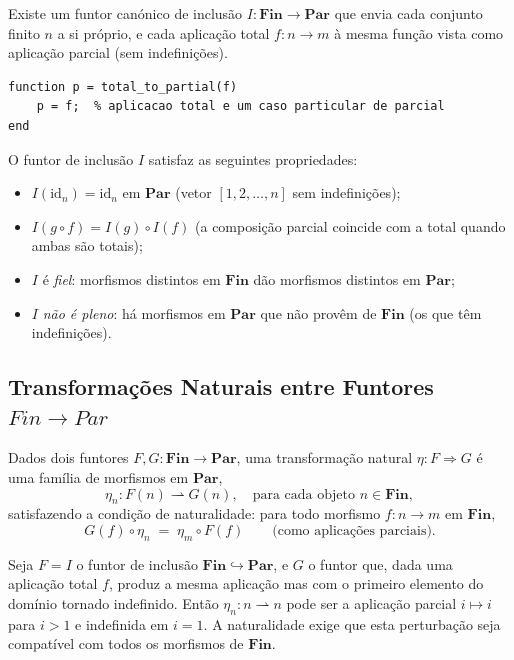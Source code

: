 Existe um funtor canónico de inclusão $I: \mathbf{Fin} \to \mathbf{Par}$ que envia cada conjunto finito $n$ a si próprio, e cada aplicação total $f: n \to m$ à mesma função vista como aplicação parcial (sem indefinições).

\begin{lstlisting}[style=matlab, caption={Funtor de inclusão $I: \mathbf{Fin} \to \mathbf{Par}$}]
function p = total_to_partial(f)
    p = f;  % aplicacao total e um caso particular de parcial
end
\end{lstlisting}

\begin{proposition}
O funtor de inclusão $I$ satisfaz as seguintes propriedades:
\begin{itemize}
    \item $I(\mathrm{id}_n) = \mathrm{id}_n$ em $\mathbf{Par}$ (vetor $[1, 2, \ldots, n]$ sem indefinições);
    \item $I(g \circ f) = I(g) \circ I(f)$ (a composição parcial coincide com a total quando ambas são totais);
    \item $I$ é \emph{fiel}: morfismos distintos em $\mathbf{Fin}$ dão morfismos distintos em $\mathbf{Par}$;
    \item $I$ \emph{não é pleno}: há morfismos em $\mathbf{Par}$ que não provêm de $\mathbf{Fin}$ (os que têm indefinições).
\end{itemize}
\end{proposition}

\subsection{Transformações Naturais entre Funtores \texorpdfstring{$Fin \to Par$}{Fin -> Par}}

Dados dois funtores $F, G: \mathbf{Fin} \to \mathbf{Par}$, uma transformação natural $\eta: F \Rightarrow G$ é uma família de morfismos em $\mathbf{Par}$,
\[
    \eta_n: F(n) \rightharpoonup G(n), \quad \text{para cada objeto } n \in \mathbf{Fin},
\]
satisfazendo a condição de naturalidade: para todo morfismo $f: n \to m$ em $\mathbf{Fin}$,
\[
    G(f) \circ \eta_n \;=\; \eta_m \circ F(f) \qquad \text{(como aplicações parciais)}.
\]

\begin{remark}
Seja $F = I$ o funtor de inclusão $\mathbf{Fin} \hookrightarrow \mathbf{Par}$, e $G$ o funtor que, dada uma aplicação total $f$, produz a mesma aplicação mas com o primeiro elemento do domínio tornado indefinido. Então $\eta_n: n \rightharpoonup n$ pode ser a aplicação parcial $i \mapsto i$ para $i > 1$ e indefinida em $i = 1$. A naturalidade exige que esta perturbação seja compatível com todos os morfismos de $\mathbf{Fin}$.
\end{remark}
